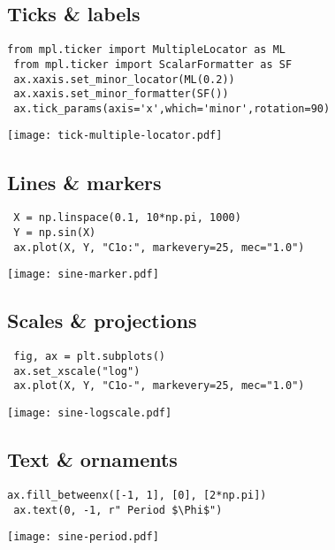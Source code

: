 \documentclass[10pt,landscape,a4paper]{article}
\begin{document}
\begin{multicols*}{3}
\subsection*{\rmfamily Ticks \& labels}

\begin{lstlisting}[basicstyle=\ttfamily\small]
 from mpl.ticker import MultipleLocator as ML
 from mpl.ticker import ScalarFormatter as SF
 ax.xaxis.set_minor_locator(ML(0.2))
 ax.xaxis.set_minor_formatter(SF())
 ax.tick_params(axis='x',which='minor',rotation=90)
\end{lstlisting}
\texttt{[image: tick-multiple-locator.pdf]}

\subsection*{\rmfamily Lines \& markers}

\begin{lstlisting}
 X = np.linspace(0.1, 10*np.pi, 1000)
 Y = np.sin(X)
 ax.plot(X, Y, "C1o:", markevery=25, mec="1.0")
\end{lstlisting}
\texttt{[image: sine-marker.pdf]}

\subsection*{\rmfamily Scales \& projections}

\begin{lstlisting}
 fig, ax = plt.subplots()
 ax.set_xscale("log")
 ax.plot(X, Y, "C1o-", markevery=25, mec="1.0")
\end{lstlisting}
\texttt{[image: sine-logscale.pdf]}

\subsection*{\rmfamily Text \& ornaments}
\begin{lstlisting}[]
 ax.fill_betweenx([-1, 1], [0], [2*np.pi])
 ax.text(0, -1, r" Period $\Phi$")
\end{lstlisting}
\texttt{[image: sine-period.pdf]}



\end{multicols*}
\end{document}
